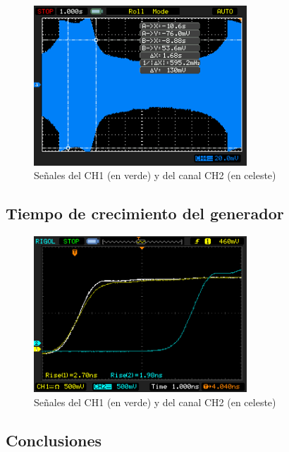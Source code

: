 \documentclass[a4paper,10pt]{article}
\begin{document}
		\begin{figure}[!htb]
			\centering
			\includegraphics[width=8cm]{Imagenes/Mediciones instrumentos/NewFile8.png}
			\caption{Se\~nales del CH1 (en verde) y del canal CH2 (en celeste)} \label{img007}
		\end{figure}
		
		\subsection{Tiempo de crecimiento del generador}
		\begin{figure}[!htb]
			\centering
			\includegraphics[width=8cm]{Imagenes/Mediciones instrumentos/NewFile10.png}
			\caption{Se\~nales del CH1 (en verde) y del canal CH2 (en celeste)} \label{img008}
		\end{figure}	
		\subsection{Conclusiones}
\end{document}
